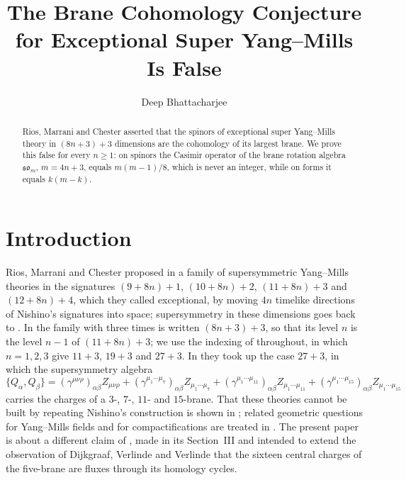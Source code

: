 \documentclass[11pt]{amsart}
\theoremstyle{remark}
\newcommand{\so}{\mathfrak{so}}
\begin{document}
\title{The Brane Cohomology Conjecture for Exceptional Super Yang--Mills Is False}

\author{Deep Bhattacharjee}
\address{Formerly, Electro-Gravitational Space Propulsion Laboratory (EGSPL), Bhubaneswar, Odisha 751030, India}
\address{Formerly, University of Calcutta (Heramba Chandra College), 23/49 Gariahat Road, Golpark, Kolkata 700029, West Bengal, India}


\begin{abstract}
Rios, Marrani and Chester asserted that the spinors of exceptional super Yang--Mills theory in $(8n+3)+3$ dimensions are the cohomology of its largest brane. We prove this false for every $n\ge1$: on spinors the Casimir operator of the brane rotation algebra $\so_m$, $m=4n+3$, equals $m(m-1)/8$, which is never an integer, while on forms it equals $k(m-k)$.
\end{abstract}

\maketitle

\section{Introduction}

Rios, Marrani and Chester proposed in \cite{RMC19} a family of supersymmetric Yang--Mills theories in the signatures $(9+8n)+1$, $(10+8n)+2$, $(11+8n)+3$ and $(12+8n)+4$, which they called exceptional, by moving $4n$ timelike directions of Nishino's signatures \cite{Nis98} into space; supersymmetry in these dimensions goes back to \cite{Nis98,RSS98}. In \cite{RMC20} the family with three times is written $(8n+3)+3$, so that its level $n$ is the level $n-1$ of $(11+8n)+3$; we use the indexing of \cite{RMC20} throughout, in which $n=1,2,3$ give $11+3$, $19+3$ and $27+3$. In \cite{RMC20} they took up the case $27+3$, in which the supersymmetry algebra
\begin{equation}\label{eq:algebra}
\{Q_\alpha,Q_\beta\}=(\gamma^{\mu\nu\rho})_{\alpha\beta}Z_{\mu\nu\rho}+(\gamma^{\mu_1\cdots\mu_7})_{\alpha\beta}Z_{\mu_1\cdots\mu_7}+(\gamma^{\mu_1\cdots\mu_{11}})_{\alpha\beta}Z_{\mu_1\cdots\mu_{11}}+(\gamma^{\mu_1\cdots\mu_{15}})_{\alpha\beta}Z_{\mu_1\cdots\mu_{15}}
\end{equation}
carries the charges of a $3$-, $7$-, $11$- and $15$-brane. That these theories cannot be built by repeating Nishino's construction is shown in \cite{Bha26}; related geometric questions for Yang--Mills fields and for compactifications are treated in \cite{BSB26,BFS26}. The present paper is about a different claim of \cite{RMC20}, made in its Section~III and intended to extend the observation of Dijkgraaf, Verlinde and Verlinde \cite{DVV97} that the sixteen central charges of the five-brane are fluxes through its homology cycles.
\end{document}
